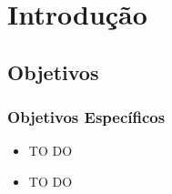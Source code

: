 \chapter{Introdução}
\label{introducao}

\section{Objetivos}

\subsection{Objetivos Específicos}
\begin{itemize}
  \item TO DO
  \item TO DO
\end{itemize}
